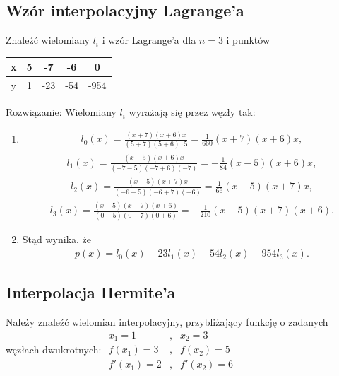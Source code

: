 \documentclass[12pt]{article}
\begin{document}
    \subsection{Wzór interpolacyjny Lagrange'a}
    \begin{exercise}
        Znaleźć wielomiany $l_i$ i wzór Lagrange'a dla $n=3$ i punktów
        \begin{tabular}{|c|c|c|c|c|}
            \hline
            x & 5 & -7 & -6 & 0    \\ \hline
            y & 1 & -23 & -54 & -954 \\ \hline
        \end{tabular}
    \end{exercise}
    Rozwiązanie:
    Wielomiany $l_i$ wyrażają się przez węzły tak:
    \begin{enumerate}
        \item
        \begin{align*}
            l_0(x)=\frac{(x+7)(x+6)x}{(5+7)(5+6)\cdot5}=\frac{1}{660}(x+7)(x+6)x,
        \end{align*}
        \begin{align*}
            l_1(x)=\frac{(x-5)(x+6)x}{(-7-5)(-7+6)(-7)}=-\frac{1}{84}(x-5)(x+6)x,
        \end{align*}
        \begin{align*}
            l_2(x)=\frac{(x-5)(x+7)x}{(-6-5)(-6+7)(-6)}=\frac{1}{66}(x-5)(x+7)x,
        \end{align*}
        \begin{align*}
            l_3(x)=\frac{(x-5)(x+7)(x+6)}{(0-5)(0+7)(0+6)}=-\frac{1}{210}(x-5)(x+7)(x+6).
        \end{align*}


        \item
        Stąd wynika, że
        \begin{align*}
            p(x)=l_0(x)-23l_1(x)-54l_2(x)-954l_3(x).
        \end{align*}
    \end{enumerate}

    \subsection{Interpolacja Hermite’a}
    \begin{exercise}
        Należy znaleźć wielomian interpolacyjny, przybliżający funkcję o zadanych węzłach dwukrotnych:
        ${\begin{array}{lcl}
              x_{1}=1&,&x_{2}=3\\f(x_{1})=3&,&f(x_{2})=5\\f'(x_{1})=2&,&f'(x_{2})=6
        \end{array}}$
    \end{exercise}
\end{document}
